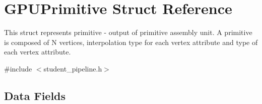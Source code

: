 \hypertarget{structGPUPrimitive}{\section{G\-P\-U\-Primitive Struct Reference}
\label{structGPUPrimitive}
}


This struct represents primitive -\/ output of primitive assembly unit. A primitive is composed of N vertices, interpolation type for each vertex attribute and type of each vertex attribute.  




{\ttfamily \#include $<$student\-\_\-pipeline.\-h$>$}

\subsection*{Data Fields}
